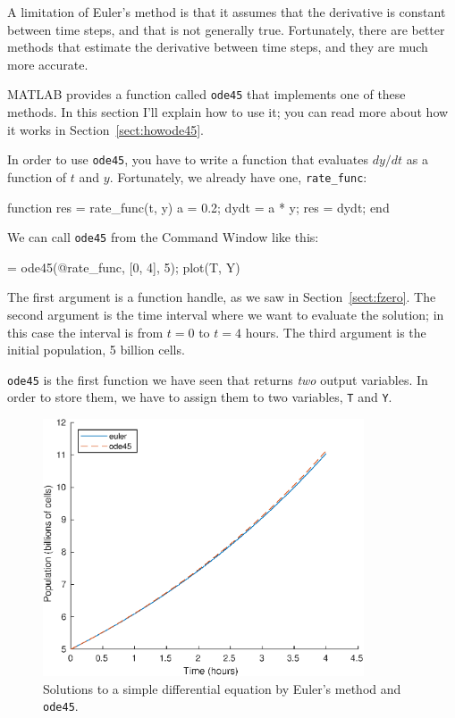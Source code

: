 \documentclass[
]{book}
\numberwithin{Answer}{chapter}
\numberwithin{Exercise}{chapter}
\begin{document}
A limitation of Euler's method is that it assumes that the derivative is constant between time steps, and that is not generally true.  Fortunately, there are better methods that estimate the derivative between time steps, and they are much more accurate.


MATLAB provides a function called {\tt ode45} that implements one of these methods.  In this section I'll explain how to use it; you can read more about how it works in Section~\ref{sect:howode45}.


In order to use {\tt ode45}, you have to write a function that evaluates $dy/dt$ as a function of $t$ and $y$.  Fortunately, we already have one, \verb"rate_func":

\begin{code}
function res = rate_func(t, y)
   a = 0.2;
   dydt = a * y;
   res = dydt;
end
\end{code}

We can call {\tt ode45} from the {\sf Command Window} like this:

\begin{code}
[T, Y] = ode45(@rate_func, [0, 4], 5);
plot(T, Y)
\end{code}

The first argument is a function handle, as we saw in Section~\ref{sect:fzero}.  The second argument is the time interval where we want to evaluate the solution; in this case the interval is from $t=0$ to $t=4$ hours.  The third argument is the initial population, 5 billion cells.


{\tt ode45} is the first function we have seen that returns {\em two} output variables.  In order to store them, we have to assign them to two variables, {\tt T} and {\tt Y}.

\begin{figure}
\centerline{\includegraphics[height=3in]{book/figs/runge.eps}}
\caption{Solutions to a simple differential equation by Euler's method and {\tt ode45}.}
\label{fig:runge}
\end{figure}
\end{document}
